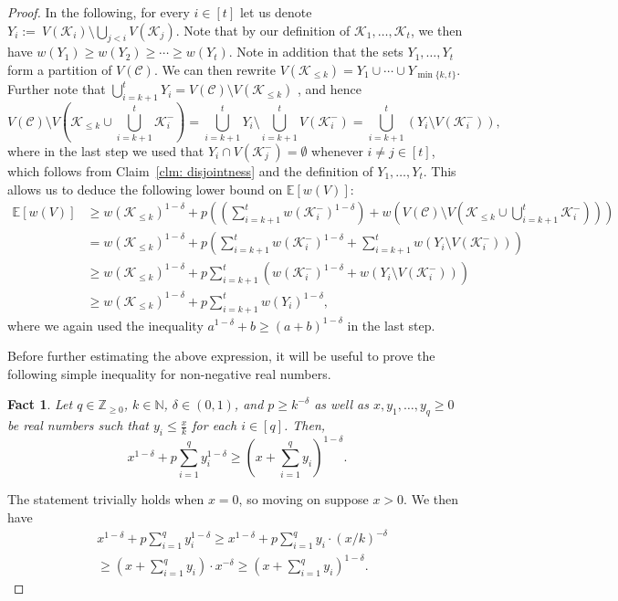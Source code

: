 \documentclass[11pt,reqno]{article}
\newtheorem{fact}[theorem]{Fact}
\newenvironment{claimproof}[1][\proofname]{\proof[#1]\renewcommand{\qedsymbol}{$\blacksquare$}}{\endproof}
\begin{document}
\begin{proof}
    In the following, for every $i\in [t]$ let us denote $Y_i:=~V(\mathcal{K}_i)\setminus \bigcup_{j<i}V(\mathcal{K}_j)$. Note that by our definition of $\mathcal{K}_1,\ldots,\mathcal{K}_t$, we then have $w(Y_1)\ge w(Y_2)\ge \cdots\ge w(Y_t)$. Note in addition that the sets $Y_1,\ldots,Y_t$ form a partition of $V(\mathcal{C})$. We can then rewrite $V(\mathcal{K}_{\le k})=Y_1\cup\cdots\cup Y_{\min\{k,t\}}$. Further note that $\bigcup_{i=k+1}^t Y_i=V(\mathcal C)\setminus V(\mathcal{K}_{\le k})$ , and hence  $$V(\mathcal C)\setminus V\left(\mathcal{K}_{\le k}\cup \bigcup_{i=k+1}^t\mathcal{K}_i^-\right)=\bigcup_{i=k+1}^t Y_i\setminus \bigcup_{i=k+1}^{t}V(\mathcal{K}_i^-)=\bigcup_{i=k+1}^{t}(Y_i\setminus V(\mathcal{K}_i^-)),$$ where in the last step we used that $Y_i\cap V(\mathcal{K}_j^-)=\emptyset$ whenever $i\neq j\in [t]$, which follows from Claim~\ref{clm: disjointness} and the definition of $Y_1,\ldots,Y_t$. This allows us to deduce the following lower bound on $\mathbb{E}[w(V)]$:
\begin{align*}\mathbb{E}[w(V)]&\ge w(\mathcal{K}_{\le k})^{1-\delta}+p\left(\left(\sum_{i=k+1}^{t} w(\mathcal{K}_i^-)^{1-\delta}\right)+w\left(V(\mathcal C)\setminus V\left(\mathcal{K}_{\le k}\cup \bigcup_{i=k+1}^t\mathcal{K}_i^-\right)\right)\right)\\
    &=w(\mathcal{K}_{\le k})^{1-\delta}+p\left(\sum_{i=k+1}^{t} w(\mathcal{K}_i^-)^{1-\delta}+\sum_{i=k+1}^t w(Y_i\setminus V(\mathcal{K}_i^-))\right)\\
    &\ge w(\mathcal{K}_{\le k})^{1-\delta}+p\sum_{i=k+1}^t (w(\mathcal{K}_i^-)^{1-\delta}+w(Y_i\setminus V(\mathcal{K}_i^-)))\\
    &\ge w(\mathcal{K}_{\le k})^{1-\delta}+p\sum_{i=k+1}^t w(Y_i)^{1-\delta},
    \end{align*} 
    where we again used the inequality $a^{1-\delta}+b\ge (a+b)^{1-\delta}$ in the last step.

    
    Before further estimating the above expression, it will be useful to prove the following simple inequality for non-negative real numbers.

    \begin{fact}\label{fact: inequality}
    Let $q\in\mathbb{Z}_{\ge 0}$, $k \in \mathbb{N}$, $\delta\in(0,1)$, and $p\ge k^{-\delta}$ as well as $x, y_1,\ldots,y_q\geq 0$ be real numbers such that $y_i\le \frac{x}{k}$ for each $i\in [q]$. Then,
    $$
    x^{1-\delta}+p\sum_{i=1}^q y_i^{1-\delta}\geq \left(x+\sum_{i=1}^qy_i\right)^{1-\delta}.
    $$
\end{fact}
\begin{claimproof}
  The statement trivially holds when $x=0$, so moving on suppose $x>0$. We then have 
    \begin{align*}
        &x^{1-\delta}+p\sum_{i=1}^q y_i^{1-\delta}\geq x^{1-\delta}+p\sum_{i=1}^q y_i\cdot (x/k)^{-\delta}\\ &\ge \left(x+\sum_{i=1}^{q}y_i\right)\cdot x^{-\delta}\ge \left(x+\sum_{i=1}^qy_i\right)^{1-\delta}.
    \end{align*}    
    \vspace{-0.8cm}


\end{claimproof}
\end{proof}
\end{document}
